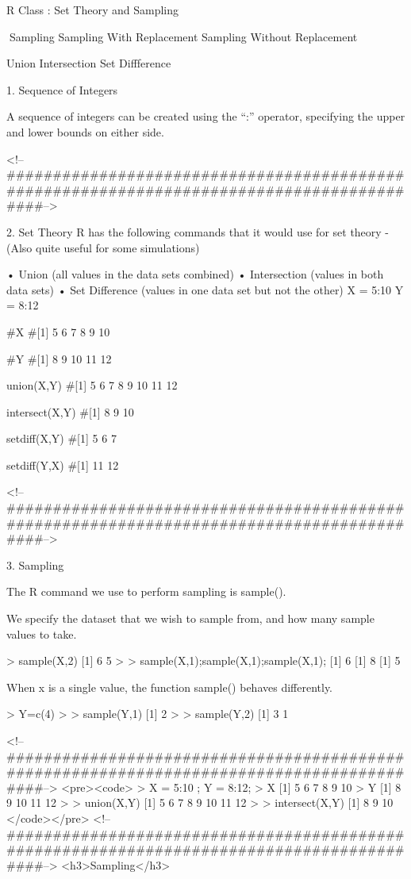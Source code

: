 R Class : Set Theory and Sampling


Sampling
Sampling With Replacement
Sampling Without Replacement


Union
Intersection
Set Diffference

1. Sequence of Integers

A sequence of integers can be created using the “:” operator, specifying the upper and lower bounds on either side.

<!--##########################################################################################-->

2. Set Theory
R has the following commands that it would use for set theory  - (Also quite useful for some simulations)

•	Union	              (all values in the data sets combined)
•	Intersection       (values in both data sets)
•	Set Difference  (values in one data set but not the other)
X = 5:10
Y = 8:12

#X
#[1] 5 6 7 8 9 10

#Y
#[1] 8 9 10 11 12

union(X,Y)
#[1] 5 6 7 8 9 10 11 12

intersect(X,Y)
#[1] 8 9 10

setdiff(X,Y)
#[1] 5 6 7

setdiff(Y,X)
#[1] 11 12

<!--##########################################################################################-->

3. Sampling

The R command we use to perform sampling is sample().

We specify the dataset that we wish to sample from, and how many sample values to take.

> sample(X,2)
[1] 6 5
>
> sample(X,1);sample(X,1);sample(X,1);
[1] 6
[1] 8
[1] 5


When x is a single value, the function sample() behaves differently.

> Y=c(4)
>
> sample(Y,1)
[1] 2
> 
> sample(Y,2)
[1] 3 1







<!--##########################################################################################-->
<pre><code>
> X = 5:10 ; Y = 8:12;
> X
[1]  5  6  7  8  9 10
> Y
[1]  8  9 10 11 12
>
> union(X,Y)
[1]  5  6  7  8  9 10 11 12
>
> intersect(X,Y)
[1]  8  9 10
</code></pre>
<!--##########################################################################################-->
<h3>Sampling</h3>


